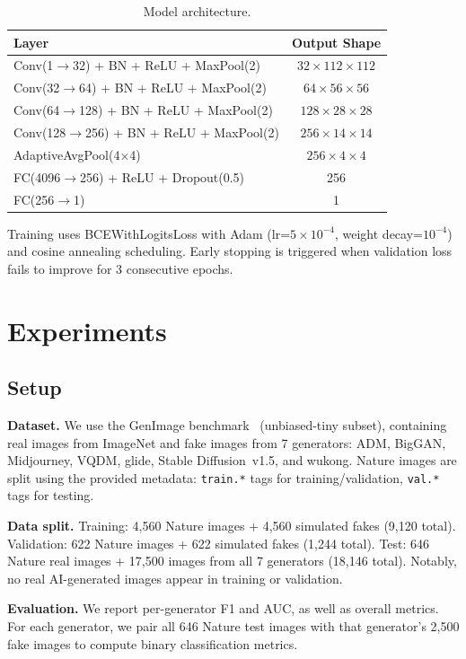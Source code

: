 \documentclass[11pt,a4paper]{article}
\begin{document}
\begin{table}[t]
\centering
\caption{Model architecture.}
\label{tab:arch}
\begin{tabular}{lc}
\toprule
Layer & Output Shape \\
\midrule
Conv(1$\to$32) + BN + ReLU + MaxPool(2) & $32 \times 112 \times 112$ \\
Conv(32$\to$64) + BN + ReLU + MaxPool(2) & $64 \times 56 \times 56$ \\
Conv(64$\to$128) + BN + ReLU + MaxPool(2) & $128 \times 28 \times 28$ \\
Conv(128$\to$256) + BN + ReLU + MaxPool(2) & $256 \times 14 \times 14$ \\
AdaptiveAvgPool(4$\times$4) & $256 \times 4 \times 4$ \\
FC(4096$\to$256) + ReLU + Dropout(0.5) & 256 \\
FC(256$\to$1) & 1 \\
\bottomrule
\end{tabular}
\end{table}

Training uses BCEWithLogitsLoss with Adam (lr=$5 \times 10^{-4}$, weight decay=$10^{-4}$) and cosine annealing scheduling. Early stopping is triggered when validation loss fails to improve for 3 consecutive epochs.

\section{Experiments}

\subsection{Setup}

\textbf{Dataset.}
We use the GenImage benchmark~\cite{zhu2023genimage} (unbiased-tiny subset), containing real images from ImageNet and fake images from 7 generators: ADM, BigGAN, Midjourney, VQDM, glide, Stable Diffusion~v1.5, and wukong. Nature images are split using the provided metadata: \texttt{train.*} tags for training/validation, \texttt{val.*} tags for testing.

\textbf{Data split.}
Training: 4,560 Nature images + 4,560 simulated fakes (9,120 total). Validation: 622 Nature images + 622 simulated fakes (1,244 total). Test: 646 Nature real images + 17,500 images from all 7 generators (18,146 total). Notably, no real AI-generated images appear in training or validation.

\textbf{Evaluation.}
We report per-generator F1 and AUC, as well as overall metrics. For each generator, we pair all 646 Nature test images with that generator's 2,500 fake images to compute binary classification metrics.
\end{document}
